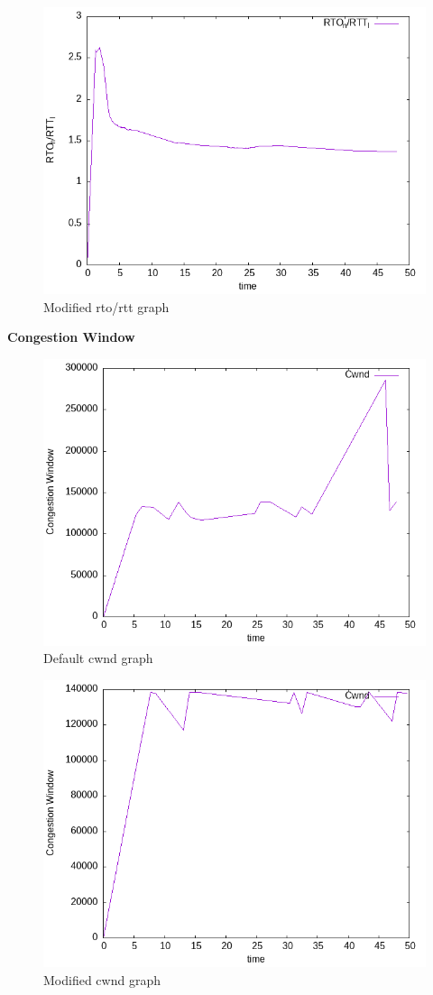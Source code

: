 \documentclass{article}[12pt]
\begin{document}
\begin{figure}[H]
	\centering
	\includegraphics[height=0.6\textwidth]{Pictures/rtt/175/m/rto_by_rtt.png}
	\caption{Modified rto/rtt graph}
\end{figure}   

\newpage
\textbf{Congestion Window}
\begin{figure}[H]
	\centering
	\includegraphics[height=0.6\textwidth]{Pictures/rtt/175/b/cwnd_graph.png}
	\caption{Default cwnd graph}
\end{figure}   

\begin{figure}[H]
	\centering
	\includegraphics[height=0.6\textwidth]{Pictures/rtt/175/m/cwnd_graph.png}
	\caption{Modified cwnd graph}
\end{figure}   
\end{document}
